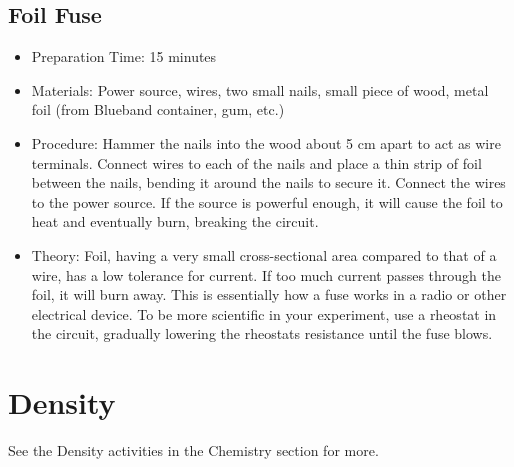 \subsection{Foil Fuse}
\begin{itemize}
\item{Preparation Time: 15 minutes}
\item{Materials: Power source, wires, two small nails, small piece of wood, metal foil (from Blueband container, gum, etc.)}
\item{Procedure: Hammer the nails into the wood about 5 cm apart to act as wire terminals. Connect wires to each of the nails and place a thin strip of foil between the nails, bending it around the nails to secure it. Connect the wires to the power source. If the source is powerful enough, it will cause the foil to heat and eventually burn, breaking the circuit.}
\item{Theory: Foil, having a very small cross-sectional area compared to that of a wire, has a low tolerance for current. If too much current passes through the foil, it will burn away. This is essentially how a fuse works in a radio or other electrical device. To be more scientific in your experiment, use a rheostat in the circuit, gradually lowering the rheostats resistance until the fuse blows.}
\end{itemize}

\section{Density}
See the Density activities in the Chemistry section for more.

